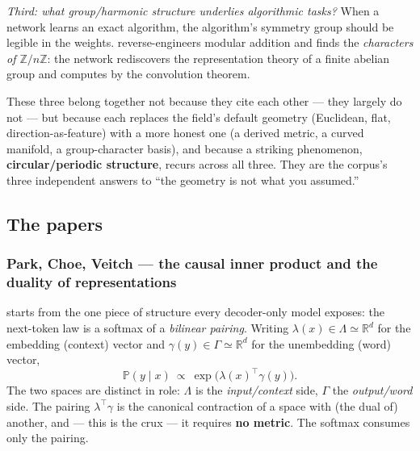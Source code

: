 \emph{Third: what group/harmonic structure underlies algorithmic tasks?} When a network learns an exact algorithm, the algorithm's symmetry group should be legible in the weights. \textcite{progress-measures-for-grokking} reverse-engineers modular addition and finds the \emph{characters of $\mathbb{Z}/n\mathbb{Z}$}: the network rediscovers the representation theory of a finite abelian group and computes by the convolution theorem.

These three belong together not because they cite each other --- they largely do not --- but because each replaces the field's default geometry (Euclidean, flat, direction-as-feature) with a more honest one (a derived metric, a curved manifold, a group-character basis), and because a striking phenomenon, \textbf{circular/periodic structure}, recurs across all three. They are the corpus's three independent answers to ``the geometry is not what you assumed.''


\subsection*{The papers}

\subsubsection*{Park, Choe, Veitch --- the causal inner product and the duality of representations}

\textcite{linear-representation-hypothesis-geometry} starts from the one piece of structure every decoder-only model exposes: the next-token law is a softmax of a \emph{bilinear pairing}. Writing $\lambda(x)\in\Lambda\simeq\mathbb{R}^{d}$ for the embedding (context) vector and $\gamma(y)\in\Gamma\simeq\mathbb{R}^{d}$ for the unembedding (word) vector,
\[
\mathbb{P}(y\mid x)\ \propto\ \exp\!\big(\lambda(x)^{\top}\gamma(y)\big).
\]
The two spaces are distinct in role: $\Lambda$ is the \emph{input/context} side, $\Gamma$ the \emph{output/word} side. The pairing $\lambda^{\top}\gamma$ is the canonical contraction of a space with (the dual of) another, and --- this is the crux --- it requires \textbf{no metric}. The softmax consumes only the pairing.

